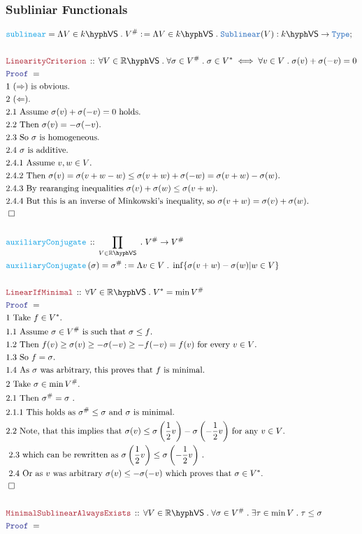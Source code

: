\documentclass[12pt]{scrartcl}
\newcommand{\TYPE}[1]{\textcolor{NavyBlue}{\mathtt{#1}}}
\newcommand{\FUNC}[1]{\textcolor{Cerulean}{\mathtt{#1}}}
\newcommand{\LOGIC}[1]{\textcolor{Blue}{\mathtt{#1}}}
\newcommand{\THM}[1]{\textcolor{Maroon}{\mathtt{#1}}}
\renewcommand{\.}{\; . \;}
\newcommand{\de}{: \kern 0.1pc =}
\newcommand{\Act}[1]{\left( #1 \right)}
\newcommand{\Theorem}[2]{& \THM{#1} \, :: \, #2 \\ & \Proof = \\ }
\newcommand{\DeclareFunc}[2]{& \FUNC{#1} \, :: \, #2 \\}
\newcommand{\DefineNamedFunc}[4]{&  \FUNC{#1}\Act{#2} = #3 \de #4 \\}
\newcommand{\Page}[1]{ \begin{align*} #1 \end{align*}   }
\newcommand{\Explain}[1]{& \text{#1.} \\}
\newcommand{\Type}{\TYPE{Type}}
\newcommand{\Reals}{\mathbb{R} }
\newcommand{\Conclude}[3]{& #1 \de #2 : #3; \\}
\newcommand{\QED}{\; \square}
\newcommand{\EndProof}{& \QED \\}
\newcommand{\Proof}{\LOGIC{Proof} \; }
\newcommand{\VS}[1]{#1\hyph\mathsf{VS}} %
\begin{document}
\subsubsection{Subliniar Functionals}
\Page{
	\Conclude{\FUNC{sublinear} = \Lambda V \in \VS{k} \. V^\# }
	{
		 \Lambda V \in \VS{k} \. \TYPE{Sublinear}(V)
	}{\VS{k} \to \Type}
	\\
	\Theorem{LinearityCriterion}
	{
		\forall V \in \VS{\Reals} \.
		\forall \sigma \in V^\# \.
		\sigma \in V^*
		\iff
		\forall v \in V \.
		\sigma(v) + \sigma(-v) = 0
	}
	\Explain{1 $(\Rightarrow)$ is obvious}
	\Explain{2 $(\Leftarrow)$}
	\Explain{2.1 Assume $\sigma(v) + \sigma(-v) = 0$ holds}
	\Explain{2.2 Then $\sigma(v) = -\sigma(-v)$}
	\Explain{2.3 So $\sigma$ is homogeneous}
	\Explain{2.4 $\sigma$ is additive}
	\Explain{2.4.1 Assume $v,w \in V$}
	\Explain{2.4.2 Then $\sigma(v) = \sigma(v + w - w) 
		\le \sigma(v + w) + \sigma(-w) = \sigma(v + w) - \sigma(w) $}
	\Explain{2.4.3 By rearanging inequalities $\sigma(v) + \sigma(w) \le \sigma(v + w)$}
	\Explain{2.4.4 But this is an inverse of Minkowski's inequality, so 
		$\sigma(v+w) = \sigma(v) + \sigma(w) $}
	\EndProof
	\\
	\DeclareFunc{auxiliaryConjugate}
	{
		\prod_{V \in \VS{\Reals}} \. V^\# \to V^\# 
	}
	\DefineNamedFunc{auxiliaryConjugate}{\sigma}{\sigma^\#}
	{
		\Lambda v \in V \. \inf \{  \sigma(v + w) - \sigma(w) | w \in V  \}
	}
	\\
	\Theorem{LinearIfMinimal}
	{
		\forall V \in \VS{\Reals} \.  V^*  = \min V^\#
	}
	\Explain{1 Take $f \in V^*$}
	\Explain{1.1 Assume $\sigma \in V^\#$ is such that $\sigma \le f$}
	\Explain{1.2 Then $f(v) \ge \sigma(v) \ge -\sigma(-v) \ge - f(-v) = f(v)$ for every $v \in V$}
	\Explain{1.3 So $f = \sigma$}
	\Explain{1.4 As $\sigma$ was arbitrary, this proves that $f$ is minimal}
	\Explain{2 Take $\sigma \in \min V^\#$}
	\Explain{2.1 Then $\sigma^\# = \sigma$ }
	\Explain{2.1.1 This holds as $\sigma^\# \le \sigma$ and $\sigma$ is minimal}
	\Explain{2.2 Note, that this implies that $\sigma(v) \le  
		\sigma\left(\frac{1}{2}v\right) - \sigma\left( -\frac{1}{2}v\right) $ for any $v \in V $}
	\Explain{ 2.3 which can be rewritten as   
		$
			\sigma\left(\frac{1}{2}v\right) \le \sigma\left( -\frac{1}{2}v\right)
		$
	}
	\Explain{ 2.4 Or as $v$ was arbitrary $\sigma(v) \le - \sigma(-v)$ which proves that $\sigma \in V^*$}
	\EndProof
	\\
	\Theorem{MinimalSublinearAlwaysExists}
	{
		\forall V \in \VS{\Reals} \.
		\forall \sigma \in V^\# \.
		\exists \tau \in \min V \.
		\tau \le \sigma
}}
\end{document}

